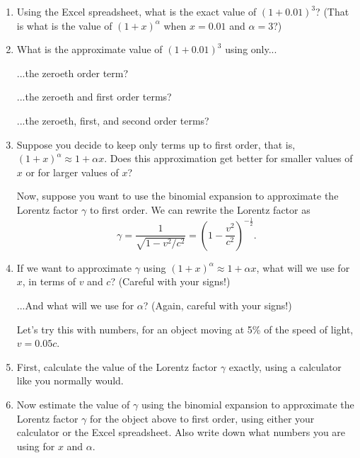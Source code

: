 \begin{enumerate}
\item Using the Excel spreadsheet, what is the exact value of $(1+0.01)^3$?  (That is what is the value of $(1+x)^\alpha$ when $x=0.01$ and $\alpha=3$?)
\answerspace{0.4in}

\item What is the approximate value of $(1+0.01)^3$ using only...

\medskip
\hspace{0.5in}...the zeroeth order term?

\medskip
\hspace{0.5in}...the zeroeth and first order terms?

\medskip
\hspace{0.5in}...the zeroeth, first, and second order terms?

\medskip
\item Suppose you decide to keep only terms up to first order, that is, $(1+x)^\alpha \approx 1+\alpha x$.  Does this approximation get better for smaller values of $x$ or for larger values of $x$?
\answerspace{0.5in}


Now, suppose you want to use the binomial expansion to approximate the Lorentz factor $\gamma$ to first order.  We can rewrite the Lorentz factor as
\begin{equation}
\gamma=\frac{1}{\sqrt{1 - {v^2}/{c^2}}} = \left(1 - \frac{v^2}{c^2}\right) ^{-\frac{1}{2}}.
\label{gamma_as_a_power}
\end{equation}

\item  If we want to approximate $\gamma$ using $(1+x)^\alpha \approx 1 + \alpha x$, what will we use for $x$, in terms of $v$ and $c$?  (Careful with your signs!)
\answerspace{0.4in}

...And what will we use for $\alpha$?  (Again, careful with your signs!)
\answerspace{0.5in}

\pagebreak[3]
Let's try this with numbers, for an object moving at 5\% of the speed of light, $v=0.05c$. 

\medskip
\item First, calculate the value of the Lorentz factor $\gamma$ exactly, using a calculator like you normally would.
\answerspace{0.5in}

\item Now estimate the value of $\gamma$ using the binomial expansion to approximate the Lorentz factor $\gamma$ for the object above to first order, using either your calculator or the Excel spreadsheet.  Also write down what numbers you are using for $x$ and $\alpha$. 
\label{part_approx_for_gamma}
\answerspace{0.7in}


\end{enumerate}
